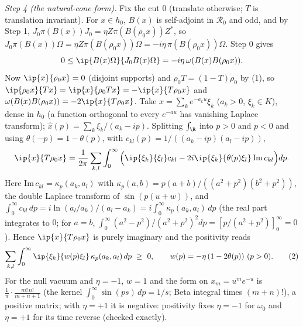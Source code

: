 \emph{Step 4 (the natural-cone form).} Fix the cut $0$ (translate otherwise; $T$ is translation invariant). For $x \in h_{0}$, $B(x)$ is self-adjoint in $\mathcal{R}_{0}$ and odd, and by Step 1, $J_{0}\pi(B(x))J_{0} = \eta Z\pi(B(\rho_{0}x))Z^{*}$, so $J_{0}\pi(B(x))\Omega = \eta Z\pi(B(\rho_{0}x))\Omega = -i\eta\,\pi(B(\rho_{0}x))\Omega$. Step 0 gives
\[ 0 \le \ip{B(x)\Omega}{J_{0}B(x)\Omega} = -i\eta\,\omega(B(x)B(\rho_{0}x)). \]
Now $\ip{x}{\rho_{0}x} = 0$ (disjoint supports) and $\rho_{0}T = (1 - T)\rho_{0}$ by (1), so $\ip{\rho_{0}x}{Tx} = \ip{x}{\rho_{0}Tx} = -\ip{x}{T\rho_{0}x}$ and $\omega(B(x)B(\rho_{0}x)) = -2\ip{x}{T\rho_{0}x}$. Take $x = \sum_{k}e^{-a_{k}u}\xi_{k}$ ($a_{k} > 0$, $\xi_{k} \in K$), dense in $h_{0}$ (a function orthogonal to every $e^{-au}$ has vanishing Laplace transform); $\hat x(p) = \sum_{k}\xi_{k}/(a_{k} - ip)$. Splitting $\int_{\R}$ into $p > 0$ and $p < 0$ and using $\theta(-p) = 1 - \theta(p)$, with $c_{kl}(p) = 1/((a_{k} - ip)(a_{l} - ip))$,
\[ \ip{x}{T\rho_{0}x} = \frac{1}{2\pi}\sum_{k, l}\int_{0}^{\infty}\Big(\ip{\xi_{k}}{\xi_{l}}c_{kl} - 2i\ip{\xi_{k}}{\theta(p)\xi_{l}}\,\mathrm{Im}\,c_{kl}\Big)dp. \]
Here $\mathrm{Im}\,c_{kl} = \kappa_{p}(a_{k}, a_{l})$ with $\kappa_{p}(a, b) = p(a + b)/((a^{2} + p^{2})(b^{2} + p^{2}))$, the double Laplace transform of $\sin(p(u + w))$, and $\int_{0}^{\infty}c_{kl}\,dp = i\ln(a_{l}/a_{k})/(a_{l} - a_{k}) = i\int_{0}^{\infty}\kappa_{p}(a_{k}, a_{l})\,dp$ (the real part integrates to $0$; for $a = b$, $\int_{0}^{\infty}(a^{2} - p^{2})/(a^{2} + p^{2})^{2}dp = [p/(a^{2} + p^{2})]_{0}^{\infty} = 0$). Hence $\ip{x}{T\rho_{0}x}$ is purely imaginary and the positivity reads
\[ \sum_{k, l}\int_{0}^{\infty}\ip{\xi_{k}}{w(p)\xi_{l}}\,\kappa_{p}(a_{k}, a_{l})\,dp \ \ge\ 0, \qquad w(p) = -\eta\,(1 - 2\theta(p))\ (p > 0). \tag{2} \]
For the null vacuum and $\eta = -1$, $w = 1$ and the form on $x_{m} = u^{m}e^{-u}$ is $\tfrac{1}{\pi}\cdot\tfrac{m!\,n!}{m + n + 1}$ (the kernel $\int_{0}^{\infty}\sin(ps)\,dp = 1/s$; Beta integral times $(m + n)!$), a positive matrix; with $\eta = +1$ it is negative: positivity fixes $\eta = -1$ for $\omega_{0}$ and $\eta = +1$ for its time reverse (checked exactly).

